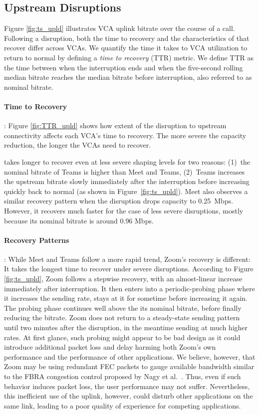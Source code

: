 \subsection{Upstream Disruptions}

Figure \ref{fig:ts_upld} illustrates VCA uplink bitrate over the course of a
call. Following a disruption, both the time to recovery and the
characteristics of that recover
differ across VCAs. We quantify the time it takes to
VCA utilization to return to normal by defining a 
\textit{time to recovery} (TTR) metric. We define TTR as the time between when the
interruption ends and when the five-second rolling median bitrate reaches the
median bitrate before interruption, also referred to as nominal bitrate. 

\paragraph{Time to Recovery}: Figure \ref{fig:TTR_upld} shows how extent of
the disruption to upstream connectivity affects each VCA's time to recovery.
The more severe the capacity reduction, the longer the VCAs need to recover.

\teams takes longer to recover even at less severe shaping levels for two
reasons: (1)~the nominal bitrate of Teams is higher than Meet and Teams,
(2)~Teams increases the upstream bitrate slowly immediately after the
interruption before increasing quickly back to normal (as shown in
Figure~\ref{fig:ts_upld}). Meet also observes a similar recovery pattern when
the disruption drops capacity to 0.25~Mbps. However, it recovers much faster
for the case of less severe disruptions, mostly because its nominal bitrate is
around 0.96 Mbps. 

\paragraph{Recovery Patterns}: While Meet and Teams follow a more rapid trend,
Zoom's recovery is different: It takes the longest time to recover under
severe disruptions. According to Figure \ref{fig:ts_upld}, Zoom follows a
stepwise recovery, with an almost-linear increase immediately after
interruption. It then enters into a periodic-probing phase where it increases
the sending rate, stays at it for sometime before increasing it again. The
probing phase continues well above the its nominal bitrate, before finally
reducing the bitrate.  Zoom does not return to a steady-state sending pattern
until two minutes after the disruption, in the meantime sending at much higher
rates. At first glance, such probing might appear to be bad design as it could
introduce additional packet loss and delay harming both Zoom's own performance
and the performance of other applications.  We believe, however, that Zoom may
be using redundant FEC packets to gauge available bandwidth similar to the
FBRA congestion control proposed by Nagy et al.~\cite{nagy2014congestion}.
Thus, even if such behavior induces packet loss, the user performance may not
suffer. Nevertheless, this inefficient use of the uplink, however, could
disturb other applications on the same link, leading to a poor quality of
experience for competing applications. 

